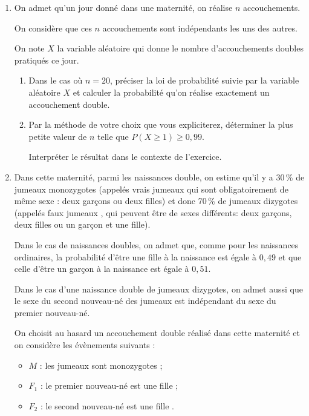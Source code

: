 \documentclass[10pt]{article}
\begin{document}
\begin{enumerate}[resume]
\item On admet qu'un jour donné dans une maternité, on réalise $n$ accouchements.

On considère que ces $n$ accouchements sont indépendants les uns des autres.

On note $X$ la variable aléatoire qui donne le nombre d'accouchements doubles pratiqués ce
jour.
	\begin{enumerate}
		\item Dans le cas où $n =  20$, préciser la loi de probabilité suivie par la variable aléatoire $X$ et calculer la probabilité qu'on réalise exactement un accouchement double.
		\item Par la méthode de votre choix que vous expliciterez, déterminer la plus petite valeur de $n$ telle que $P(X \geqslant 1) \geqslant  0,99$.

Interpréter le résultat dans le contexte de l'exercice.
	\end{enumerate}
\item Dans cette maternité, parmi les naissances double, on estime qu'il y a 30\,\% de jumeaux monozygotes (appelés \og  vrais jumeaux \fg{}  qui sont obligatoirement de même sexe : deux garçons ou deux filles) et donc 70\,\% de jumeaux dizygotes (appelés \og  faux jumeaux \fg, qui peuvent être de sexes différents: deux garçons, deux filles ou un garçon et une fille).

Dans le cas de naissances doubles, on admet que, comme pour les naissances ordinaires, la probabilité d'être une fille à la naissance est égale à $0,49$ et que celle d'être un garçon à la naissance est égale à $0,51$.

Dans le cas d'une naissance double de jumeaux dizygotes, on admet aussi que le sexe du
second nouveau-né des jumeaux est indépendant du sexe du premier nouveau-né.

On choisit au hasard un accouchement double réalisé dans cette maternité et on considère les évènements suivants :

\begin{itemize}
\item[$\bullet~~$]$M$ : \og  les jumeaux sont monozygotes \fg{}  ;
\item[$\bullet~~$]$F_1$ : \og le premier nouveau-né est une fille \fg{} ;
\item[$\bullet~~$]$F_2$ : \og le second nouveau-né est une fille \fg.
\end{itemize}


\end{enumerate}
\end{document}
